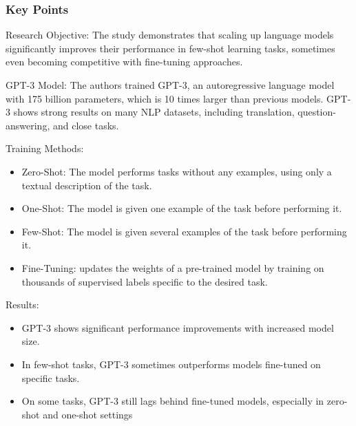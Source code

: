 \documentclass[11pt]{article}
\begin{document}
\subsubsection{Key Points}
Research Objective: The study demonstrates that scaling up language models significantly improves their performance in few-shot learning tasks, sometimes even becoming competitive with fine-tuning approaches.

GPT-3 Model: The authors trained GPT-3, an autoregressive language model with 175 billion parameters, which is 10 times larger than previous models. GPT-3 shows strong results on many NLP datasets, including translation, question-answering, and close tasks.

Training Methods:
\begin{itemize}
    \item Zero-Shot: The model performs tasks without any examples, using only a textual description of the task.
    \item One-Shot: The model is given one example of the task before performing it.
    \item Few-Shot: The model is given several examples of the task before performing it.
    \item Fine-Tuning: updates the weights of a pre-trained model by training on thousands of
supervised labels specific to the desired task.
\end{itemize}
Results:
\begin{itemize}
    \item GPT-3 shows significant performance improvements with increased model size.
    \item In few-shot tasks, GPT-3 sometimes outperforms models fine-tuned on specific tasks.
    \item On some tasks, GPT-3 still lags behind fine-tuned models, especially in zero-shot and one-shot settings
\end{itemize}
\end{document}
